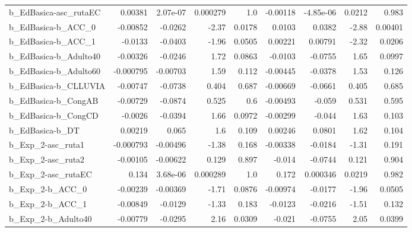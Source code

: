 \begin{tabular}{lrrrrrrrr}
b\_EdBasica-asc\_rutaEC      &     0.00381 &     2.07e-07 &  0.000279 &      1.0 &   -0.00118 &   -4.85e-06 &       0.0212 &         0.983 \\
b\_EdBasica-b\_ACC\_0         &    -0.00852 &      -0.0262 &     -2.37 &   0.0178 &     0.0103 &      0.0382 &        -2.88 &       0.00401 \\
b\_EdBasica-b\_ACC\_1         &     -0.0133 &      -0.0403 &     -1.96 &   0.0505 &    0.00221 &     0.00791 &        -2.32 &        0.0206 \\
b\_EdBasica-b\_Adulto40      &    -0.00326 &      -0.0246 &      1.72 &   0.0863 &    -0.0103 &     -0.0755 &         1.65 &        0.0997 \\
b\_EdBasica-b\_Adulto60      &   -0.000795 &     -0.00703 &      1.59 &    0.112 &   -0.00445 &     -0.0378 &         1.53 &         0.126 \\
b\_EdBasica-b\_CLLUVIA       &    -0.00747 &      -0.0738 &     0.404 &    0.687 &   -0.00669 &     -0.0661 &        0.405 &         0.685 \\
b\_EdBasica-b\_CongAB        &    -0.00729 &      -0.0874 &     0.525 &      0.6 &   -0.00493 &      -0.059 &        0.531 &         0.595 \\
b\_EdBasica-b\_CongCD        &     -0.0026 &      -0.0394 &      1.66 &   0.0972 &   -0.00299 &      -0.044 &         1.63 &         0.103 \\
b\_EdBasica-b\_DT            &     0.00219 &        0.065 &       1.6 &    0.109 &    0.00246 &      0.0801 &         1.62 &         0.104 \\
b\_Exp\_2-asc\_ruta1          &   -0.000793 &     -0.00496 &     -1.38 &    0.168 &   -0.00338 &     -0.0184 &        -1.31 &         0.191 \\
b\_Exp\_2-asc\_ruta2          &    -0.00105 &     -0.00622 &     0.129 &    0.897 &     -0.014 &     -0.0744 &        0.121 &         0.904 \\
b\_Exp\_2-asc\_rutaEC         &       0.134 &     3.68e-06 &  0.000289 &      1.0 &      0.172 &    0.000346 &       0.0219 &         0.982 \\
b\_Exp\_2-b\_ACC\_0            &    -0.00239 &     -0.00369 &     -1.71 &   0.0876 &   -0.00974 &     -0.0177 &        -1.96 &        0.0505 \\
b\_Exp\_2-b\_ACC\_1            &    -0.00849 &      -0.0129 &     -1.33 &    0.183 &    -0.0123 &     -0.0216 &        -1.51 &         0.132 \\
b\_Exp\_2-b\_Adulto40         &    -0.00779 &      -0.0295 &      2.16 &   0.0309 &     -0.021 &     -0.0755 &         2.05 &        0.0399 \\

\end{tabular}
